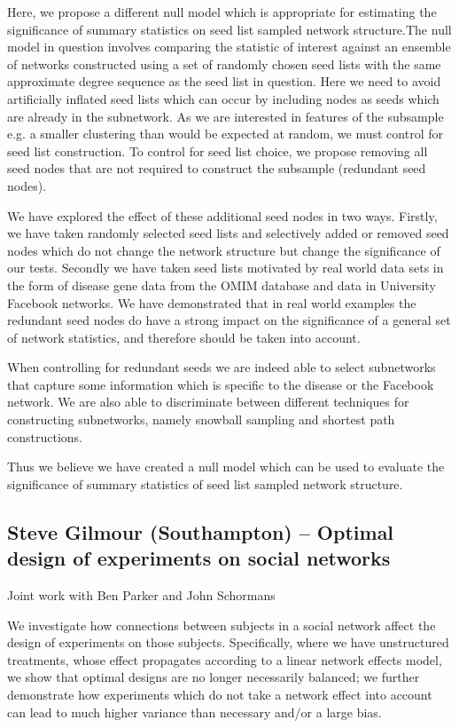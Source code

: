 \documentclass[10pt]{article}
\begin{document}
\begin{multicols}{2}
Here, we propose a different null model which is appropriate for estimating the significance of summary statistics on seed list sampled network structure.The null model in question involves comparing the statistic of interest against an ensemble of networks constructed using a set of randomly chosen seed lists with the same approximate degree sequence as the seed list in question. Here we need to avoid artificially inflated seed lists which can occur by including nodes as seeds which are already in the subnetwork. As we are interested in features of the subsample e.g. a smaller clustering than would be expected at random, we must control for seed list construction. To control for seed list choice, we propose removing all seed nodes that are not required to construct the subsample (redundant seed nodes).

We have explored the effect of these additional seed nodes in two ways. Firstly, we have taken randomly selected seed lists and selectively added or removed seed nodes which do not change the network structure but change the significance of our tests. Secondly we have taken seed lists motivated by real world data sets in the form of disease gene data from the OMIM database and data in University Facebook networks. We have demonstrated that in real world examples the redundant seed nodes do have a strong impact on the significance of a general set of network statistics, and therefore should be taken into account.

When controlling for redundant seeds we are indeed able to select subnetworks that capture some information which is specific to the disease or the Facebook network. We are also able to discriminate between different techniques for constructing subnetworks, namely snowball sampling and shortest path constructions.

Thus we believe we have created a null model which can be used to evaluate the significance of summary statistics of seed list sampled network structure.

\subsection*{Steve Gilmour (Southampton) – Optimal design of experiments on social networks}

Joint work with Ben Parker and John Schormans

We investigate how connections between subjects in a social network affect the design of experiments on those subjects. Specifically, where we have unstructured treatments, whose effect propagates according to a linear network effects model, we show that optimal designs are no longer necessarily balanced; we further demonstrate how experiments which do not take a network effect into account can lead to much higher variance than necessary and/or a large bias.


\end{multicols}
\end{document}
